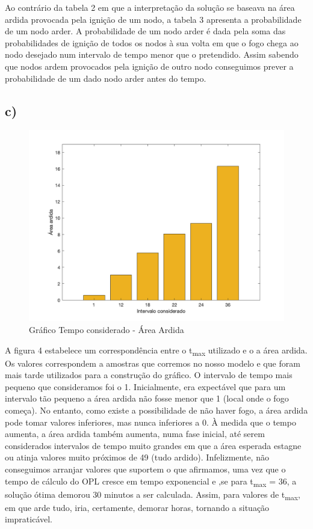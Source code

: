 \documentclass[11pt]{article} %
\begin{document}
Ao contrário da tabela 2 em que a interpretação da solução se baseava na área ardida provocada pela ignição de um nodo, a tabela 3 apresenta a probabilidade de um nodo arder. A probabilidade de um nodo arder é dada pela soma das probabilidades de ignição de todos os nodos à sua volta em que o fogo chega ao nodo desejado num intervalo de tempo menor que o pretendido. Assim sabendo que nodos ardem provocados pela ignição de outro nodo conseguimos prever a probabilidade de um dado nodo arder antes do tempo.
\newpage
\subsection*{c)}
\begin{figure}[h]
    \centering
    \includegraphics[scale=0.3]{graf3.png}
    \caption{Gráfico Tempo considerado - Área Ardida}
\end{figure}

A figura 4 estabelece um correspondência entre o t\textsubscript{max} utilizado e o a área ardida. Os valores correspondem a amostras que corremos no nosso modelo e que foram mais tarde utilizados para a construção do gráfico. O intervalo de tempo mais pequeno que consideramos foi o 1. Inicialmente, era expectável que para um intervalo tão pequeno a área ardida não fosse menor que 1 (local onde o fogo começa). No entanto, como existe a possibilidade de não haver fogo, a área ardida pode tomar valores inferiores, mas nunca inferiores a 0. À medida que o tempo aumenta, a área ardida também aumenta, numa fase inicial, até serem considerados intervalos de tempo muito grandes em que a área esperada estagne ou atinja valores muito próximos de 49 (tudo ardido). Infelizmente, não conseguimos arranjar valores que suportem o que afirmamos, uma vez que o tempo de cálculo do OPL cresce em tempo exponencial e ,se para t\textsubscript{max} = 36, a solução ótima demorou 30 minutos a ser calculada. Assim, para valores de t\textsubscript{max}, em que arde tudo, iria, certamente, demorar horas, tornando a situação impraticável.
\end{document}
